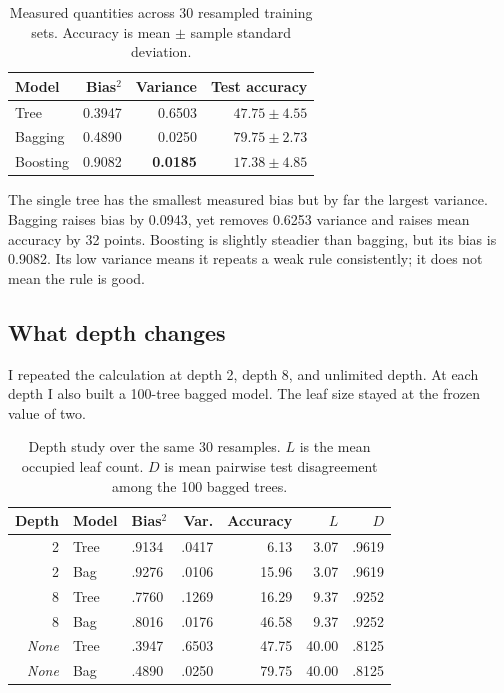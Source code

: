 \documentclass[10pt,twocolumn,letterpaper]{article}
\newcommand{\NA}{\textit{None}}
\begin{document}
\begin{table}[t]
\centering
\caption{Measured quantities across 30 resampled training sets. Accuracy is mean $\pm$ sample standard deviation.}
\label{tab:bvselected}
\scriptsize
\begin{tabular}{lrrr}
\toprule
Model & Bias$^2$ & Variance & Test accuracy\\
\midrule
Tree & 0.3947 & 0.6503 & $47.75\pm4.55$\\
Bagging & 0.4890 & 0.0250 & $79.75\pm2.73$\\
Boosting & 0.9082 & \textbf{0.0185} & $17.38\pm4.85$\\
\bottomrule
\end{tabular}
\end{table}

The single tree has the smallest measured bias but by far the largest variance. Bagging raises bias by 0.0943, yet removes 0.6253 variance and raises mean accuracy by 32 points. Boosting is slightly steadier than bagging, but its bias is 0.9082. Its low variance means it repeats a weak rule consistently; it does not mean the rule is good.

\subsection{What depth changes}
I repeated the calculation at depth 2, depth 8, and unlimited depth. At each depth I also built a 100-tree bagged model. The leaf size stayed at the frozen value of two.

\begin{table}[H]
\centering
\caption{Depth study over the same 30 resamples. $L$ is the mean occupied leaf count. $D$ is mean pairwise test disagreement among the 100 bagged trees.}
\label{tab:bvdepth}
\scriptsize
\begin{tabular}{rllrrrr}
\toprule
Depth & Model & Bias$^2$ & Var. & Accuracy & $L$ & $D$\\
\midrule
2 & Tree & .9134 & .0417 & 6.13 & 3.07 & .9619\\
2 & Bag & .9276 & .0106 & 15.96 & 3.07 & .9619\\
8 & Tree & .7760 & .1269 & 16.29 & 9.37 & .9252\\
8 & Bag & .8016 & .0176 & 46.58 & 9.37 & .9252\\
\NA & Tree & .3947 & .6503 & 47.75 & 40.00 & .8125\\
\NA & Bag & .4890 & .0250 & 79.75 & 40.00 & .8125\\
\bottomrule
\end{tabular}
\end{table}
\end{document}
